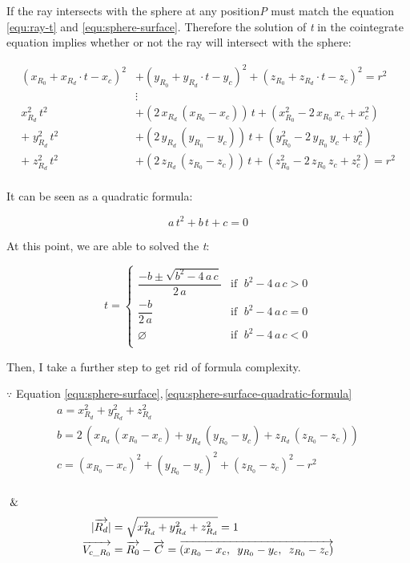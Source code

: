 If the ray intersects with the sphere at any position\;\emph{P} must match the equation \ref{equ:ray-t} and \ref{equ:sphere-surface}. Therefore the solution of \emph{t} in the cointegrate equation implies whether or not the ray will intersect with the sphere:

\[
\begin{aligned}
(x_{R_0} + x_{R_d} \cdot t - x_c)^2 &+ (y_{R_0} + y_{R_d} \cdot t - y_c)^2 + (z_{R_0} + z_{R_d} \cdot t - z_c)^2 = r^2\\
&\vdots\\
x_{R_d}^2\,t^2 &+ (2\,x_{R_d}\,(x_{R_0} - x_c))\,t + (x_{R_0}^2 - 2\,x_{R_0}\,x_c + x_c^2)\\
+\;y_{R_d}^2\,t^2 &+ (2\,y_{R_d}\,(y_{R_0} - y_c))\,t + (y_{R_0}^2 - 2\,y_{R_0}\,y_c + y_c^2)\\
+\;z_{R_d}^2\,t^2 &+ (2\,z_{R_d}\,(z_{R_0} - z_c))\,t + (z_{R_0}^2 - 2\,z_{R_0}\,z_c + z_c^2) = r^2\\
\end{aligned}
\]

It can be seen as a quadratic formula:

\begin{equation}
\label{equ:sphere-surface-quadratic-formula}
a\,t^2 + b\,t + c = 0
\end{equation}

At this point, we are able to solved the \emph{t}:

\[
t =
\begin{cases}
\dfrac{-b \pm \sqrt{b^2 - 4\,a\,c}}{2\,a} & \text{if }\;b^2 - 4\,a\,c > 0\\
\dfrac{-b}{2\,a} & \text{if }\; b^2 - 4\,a\,c = 0\\
\varnothing & \text{if }\; b^2 - 4\,a\,c < 0\\
\end{cases}
\]

Then, I take a further step to get rid of formula complexity.

$\because$ Equation \ref{equ:sphere-surface},\,\ref{equ:sphere-surface-quadratic-formula}
\[
\begin{array}{lr}
a = x_{R_d}^2 + y_{R_d}^2 + z_{R_d}^2\\
b = 2\,(x_{R_d}\,(x_{R_0} - x_c) + y_{R_d}\,(y_{R_0} - y_c) + z_{R_d}\,(z_{R_0} - z_c))\\
c = (x_{R_0} - x_c)^2 + (y_{R_0} - y_c)^2 + (z_{R_0} - z_c)^2 - r^2\\
\end{array}
\]

$\And$
\[
\begin{array}{lr}
\begin{aligned}
\lvert \overrightarrow{R_d} \rvert &= \sqrt{x_{R_d}^2 + y_{R_d}^2 + z_{R_d}^2} = 1\\
\overrightarrow{V_{c\_R_0}} &= \overrightarrow{R_0} - \overrightarrow{C} = \overrightarrow{(x_{R_0} - x_c,\enspace y_{R_0} - y_c,\enspace z_{R_0} - z_c)}\\
\end{aligned}
\end{array}
\]

